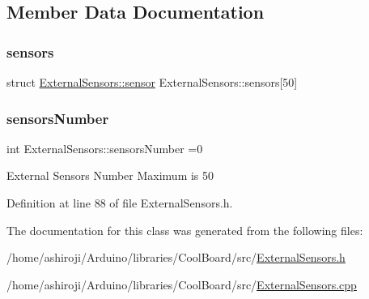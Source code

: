 \subsection{Member Data Documentation}
\mbox{\label{class_external_sensors_a284233f884fcf00154a44740cf1d9e1e}} 
\subsubsection{\texorpdfstring{sensors}{sensors}}
{\footnotesize\ttfamily struct \hyperlink{struct_external_sensors_1_1sensor}{External\+Sensors\+::sensor} External\+Sensors\+::sensors\mbox{[}50\mbox{]}\hspace{0.3cm}{\ttfamily [private]}}

\mbox{\label{class_external_sensors_a58e4fbf9adeae787d92be5fa33043b5d}} 
\subsubsection{\texorpdfstring{sensors\+Number}{sensorsNumber}}
{\footnotesize\ttfamily int External\+Sensors\+::sensors\+Number =0\hspace{0.3cm}{\ttfamily [private]}}

External Sensors Number Maximum is 50 

Definition at line 88 of file External\+Sensors.\+h.



The documentation for this class was generated from the following files\+:\begin{DoxyCompactItemize}
\item 
/home/ashiroji/\+Arduino/libraries/\+Cool\+Board/src/\hyperlink{_external_sensors_8h}{External\+Sensors.\+h}\item 
/home/ashiroji/\+Arduino/libraries/\+Cool\+Board/src/\hyperlink{_external_sensors_8cpp}{External\+Sensors.\+cpp}\end{DoxyCompactItemize}
